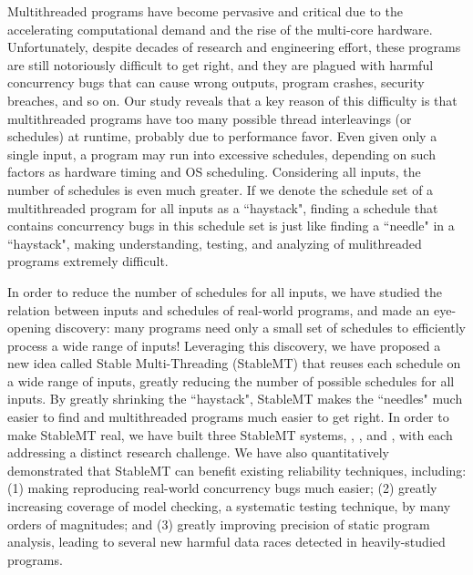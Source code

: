 Multithreaded programs have become pervasive and critical due to the
accelerating computational demand and the rise of the multi-core hardware.
Unfortunately, despite decades of research and engineering effort, these
programs are still notoriously difficult to get right, and they are plagued with
harmful concurrency bugs that can cause wrong outputs, program crashes, security
breaches, and so on. Our study reveals that a key reason of this difficulty is
that multithreaded programs have too many possible thread interleavings (or
schedules) at runtime, probably due to performance favor. Even given only a
single input, a program may run into excessive schedules, depending on such
factors as hardware timing and OS scheduling. Considering all inputs, the number
of schedules is even much greater. If we denote the schedule set of a
multithreaded program for all inputs as a ``haystack", finding a schedule that
contains concurrency bugs in this schedule set is just like finding a ``needle"
in a ``haystack", making understanding, testing, and analyzing of mulithreaded
programs extremely difficult.

In order to reduce the number of schedules for all inputs, we have studied the
relation between inputs and schedules of real-world programs, and made an
eye-opening discovery: many programs need only a small set of schedules to
efficiently process a wide range of inputs! Leveraging this discovery, we have
proposed a new idea called Stable Multi-Threading (StableMT) that reuses each
schedule on a wide range of inputs, greatly reducing the number of possible
schedules for all inputs. By greatly shrinking the ``haystack", StableMT makes
the ``needles" much easier to find and multithreaded programs much easier to get
right. In order to make StableMT real, we have built three StableMT systems,
\tern, \peregrine, and \parrot, with each addressing a distinct research
challenge. We have also quantitatively demonstrated that StableMT can benefit
existing reliability techniques, including: (1) making reproducing real-world
concurrency bugs much easier; (2) greatly increasing coverage of model checking,
a systematic testing technique, by many orders of magnitudes; and (3) greatly
improving precision of static program analysis, leading to several new harmful
data races detected in heavily-studied programs.

